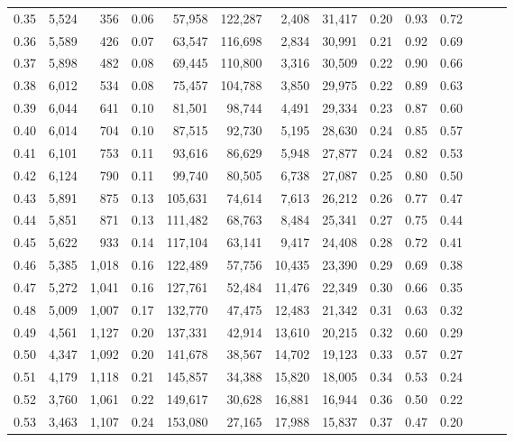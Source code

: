 \begin{tabular}{rrrrrrrrrrrrrr}
0.35 &  5,524 &    356 &  0.06 &   57,958 &  122,287 &   2,408 &  31,417 &  0.20 &  0.93 &      0.72 \\
0.36 &  5,589 &    426 &  0.07 &   63,547 &  116,698 &   2,834 &  30,991 &  0.21 &  0.92 &      0.69 \\
0.37 &  5,898 &    482 &  0.08 &   69,445 &  110,800 &   3,316 &  30,509 &  0.22 &  0.90 &      0.66 \\
0.38 &  6,012 &    534 &  0.08 &   75,457 &  104,788 &   3,850 &  29,975 &  0.22 &  0.89 &      0.63 \\
0.39 &  6,044 &    641 &  0.10 &   81,501 &   98,744 &   4,491 &  29,334 &  0.23 &  0.87 &      0.60 \\
0.40 &  6,014 &    704 &  0.10 &   87,515 &   92,730 &   5,195 &  28,630 &  0.24 &  0.85 &      0.57 \\
0.41 &  6,101 &    753 &  0.11 &   93,616 &   86,629 &   5,948 &  27,877 &  0.24 &  0.82 &      0.53 \\
0.42 &  6,124 &    790 &  0.11 &   99,740 &   80,505 &   6,738 &  27,087 &  0.25 &  0.80 &      0.50 \\
0.43 &  5,891 &    875 &  0.13 &  105,631 &   74,614 &   7,613 &  26,212 &  0.26 &  0.77 &      0.47 \\
0.44 &  5,851 &    871 &  0.13 &  111,482 &   68,763 &   8,484 &  25,341 &  0.27 &  0.75 &      0.44 \\
0.45 &  5,622 &    933 &  0.14 &  117,104 &   63,141 &   9,417 &  24,408 &  0.28 &  0.72 &      0.41 \\
0.46 &  5,385 &  1,018 &  0.16 &  122,489 &   57,756 &  10,435 &  23,390 &  0.29 &  0.69 &      0.38 \\
0.47 &  5,272 &  1,041 &  0.16 &  127,761 &   52,484 &  11,476 &  22,349 &  0.30 &  0.66 &      0.35 \\
0.48 &  5,009 &  1,007 &  0.17 &  132,770 &   47,475 &  12,483 &  21,342 &  0.31 &  0.63 &      0.32 \\
0.49 &  4,561 &  1,127 &  0.20 &  137,331 &   42,914 &  13,610 &  20,215 &  0.32 &  0.60 &      0.29 \\
0.50 &  4,347 &  1,092 &  0.20 &  141,678 &   38,567 &  14,702 &  19,123 &  0.33 &  0.57 &      0.27 \\
0.51 &  4,179 &  1,118 &  0.21 &  145,857 &   34,388 &  15,820 &  18,005 &  0.34 &  0.53 &      0.24 \\
0.52 &  3,760 &  1,061 &  0.22 &  149,617 &   30,628 &  16,881 &  16,944 &  0.36 &  0.50 &      0.22 \\
0.53 &  3,463 &  1,107 &  0.24 &  153,080 &   27,165 &  17,988 &  15,837 &  0.37 &  0.47 &      0.20 \\

\end{tabular}
